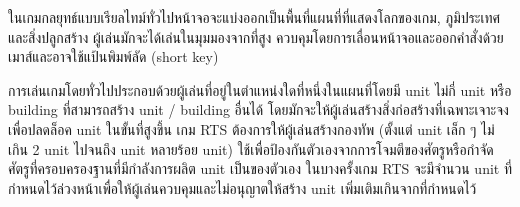\qquad ในเกมกลยุทธ์แบบเรียลไทม์ทั่วไปหน้าจอจะแบ่งออกเป็นพื้นที่แผนที่ที่แสดงโลกของเกม, ภูมิประเทศและสิ่งปลูกสร้าง ผู้เล่นมักจะได้เล่นในมุมมองจากที่สูง 
ควบคุมโดยการเลื่อนหน้าจอและออกคําสั่งด้วยเมาส์และอาจใช้แป้นพิมพ์ลัด (short key)

\enskip การเล่นเกมโดยทั่วไปประกอบด้วยผู้เล่นที่อยู่ในตําแหน่งใดที่หนึ่งในแผนที่โดยมี unit ไม่กี่ unit หรือ building ที่สามารถสร้าง unit / building อื่นได้ 
โดยมักจะให้ผู้เล่นสร้างสิ่งก่อสร้างที่เฉพาะเจาะจงเพื่อปลดล็อค unit ในขั้นที่สูงขึ้น เกม RTS ต้องการให้ผู้เล่นสร้างกองทัพ 
(ตั้งแต่ unit เล็ก ๆ ไม่เกิน 2 unit ไปจนถึง unit หลายร้อย unit) ใช้เพื่อป้องกันตัวเองจากการโจมตีของศัตรูหรือกําจัดศัตรูที่ครอบครองฐานที่มีกําลังการผลิต unit เป็นของตัวเอง 
ในบางครั้งเกม RTS จะมีจํานวน unit ที่กําหนดไว้ล่วงหน้าเพื่อให้ผู้เล่นควบคุมและไม่อนุญาตให้สร้าง unit เพิ่มเติมเกินจากที่กําหนดไว้






